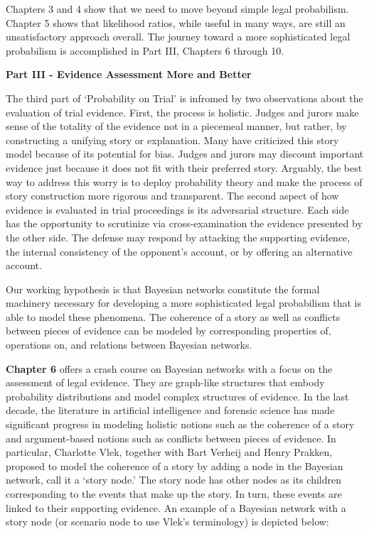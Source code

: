 \documentclass[
  10pt,
  dvipsnames,enabledeprecatedfontcommands]{scrartcl}
\begin{document}
Chapters 3 and 4 show that we need to move beyond simple legal
probabilism. Chapter 5 shows that likelihood ratios, while useful in
many ways, are still an unsatisfactory approach overall. The journey
toward a more sophisticated legal probabilism is accomplished in Part
III, Chapters 6 through 10.

\vspace{3mm}

\noindent \textbf{Part III - Evidence Assessment More and Better}

\noindent The third part of `Probability on Trial' is infromed by two
observations about the evaluation of trial evidence. First, the process
is holistic. Judges and jurors make sense of the totality of the
evidence not in a piecemeal manner, but rather, by constructing a
unifying story or explanation. Many have criticized this story model
because of its potential for bias. Judges and jurors may discount
important evidence just because it does not fit with their preferred
story. Arguably, the best way to address this worry is to deploy
probability theory and make the process of story construction more
rigorous and transparent. The second aspect of how evidence is evaluated
in trial proceedings is its adversarial structure. Each side has the
opportunity to scrutinize via cross-examination the evidence presented
by the other side. The defense may respond by attacking the supporting
evidence, the internal consistency of the opponent's account, or by
offering an alternative account.

Our working hypothesis is that Bayesian networks constitute the formal
machinery necessary for developing a more sophisticated legal
probabilism that is able to model these phenomena. The coherence of a
story as well as conflicts between pieces of evidence can be modeled by
corresponding properties of, operations on, and relations between
Bayesian networks.

\textbf{Chapter 6} offers a crash course on Bayesian networks with a
focus on the assessment of legal evidence. They are graph-like
structures that embody probability distributions and model complex
structures of evidence. In the last decade, the literature in artificial
intelligence and forensic science has made significant progress in
modeling holistic notions such as the coherence of a story and
argument-based notions such as conflicts between pieces of evidence. In
particular, Charlotte Vlek, together with Bart Verheij and Henry
Prakken, proposed to model the coherence of a story by adding a node in
the Bayesian network, call it a `story node.' The story node has other
nodes as its children corresponding to the events that make up the
story. In turn, these events are linked to their supporting evidence. An
example of a Bayesian network with a story node (or scenario node to use
Vlek's terminology) is depicted below:
\end{document}
